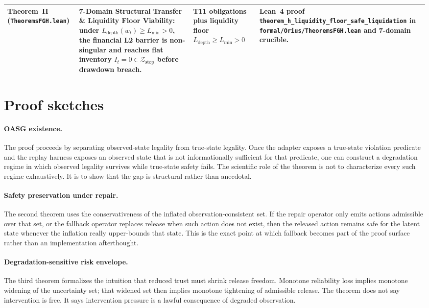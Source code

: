 \begin{longtable}{p{}p{}p{}p{}}
Theorem~H (\texttt{Theorems\allowbreak FGH.lean}) & 7-Domain Structural Transfer \& Liquidity Floor Viability: under $L_{\text{depth}}(w_t)\ge L_{\min}>0$, the financial L2 barrier is non-singular and reaches flat inventory $I_t=0\in\mathcal{Z}_{\text{stop}}$ before drawdown breach. & T11 obligations plus liquidity floor $L_{\text{depth}}\ge L_{\min}>0$ & Lean~4 proof \texttt{theorem\_\allowbreak h\_\allowbreak liquidity\_\allowbreak floor\_\allowbreak safe\_\allowbreak liquidation} in \texttt{formal/\allowbreak Orius/\allowbreak TheoremsFGH.lean} and 7-domain crucible.\\
\bottomrule
\end{longtable}

\section{Proof sketches}
\paragraph{OASG existence.}
The proof proceeds by separating observed-state legality from true-state legality. Once the
adapter exposes a true-state violation predicate and the replay harness exposes an observed
state that is not informationally sufficient for that predicate, one can construct a
degradation regime in which observed legality survives while true-state safety fails. The
scientific role of the theorem is not to characterize every such regime exhaustively. It is
to show that the gap is structural rather than anecdotal.

\paragraph{Safety preservation under repair.}
The second theorem uses the conservativeness of the inflated observation-consistent set. If
the repair operator only emits actions admissible over that set, or the fallback operator
replaces release when such action does not exist, then the released action remains safe for
the latent state whenever the inflation really upper-bounds that state. This is the exact
point at which fallback becomes part of the proof surface rather than an implementation
afterthought.

\paragraph{Degradation-sensitive risk envelope.}
The third theorem formalizes the intuition that reduced trust must shrink release freedom.
Monotone reliability loss implies monotone widening of the uncertainty set; that widened set
then implies monotone tightening of admissible release. The theorem does not say
intervention is free. It says intervention pressure is a lawful consequence of degraded
observation.

